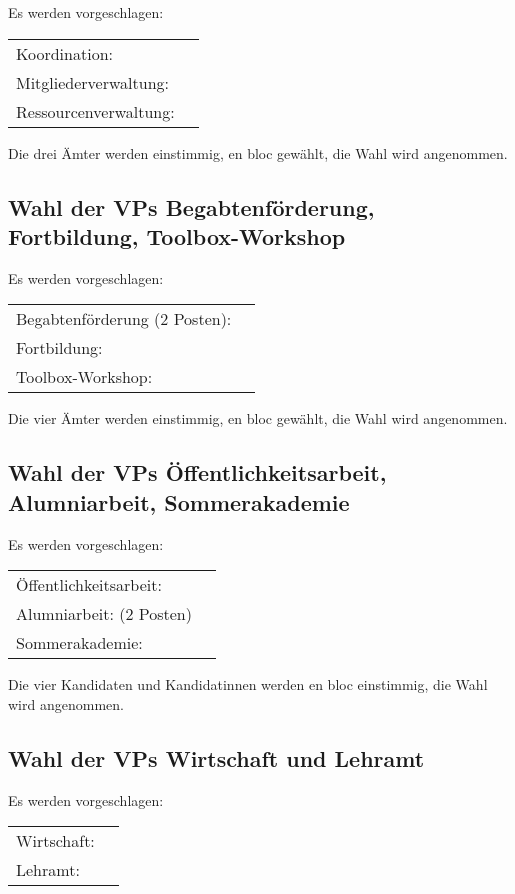 \documentclass[
  paper=a4,
  fontsize=12pt,
  parskip=half,
  headinclude=true,
]{scrartcl}
\begin{document}
Es werden vorgeschlagen:

\begin{tabular}{l l}
  Koordination: & \\
  Mitgliederverwaltung: & \\
  Ressourcenverwaltung: & \\
\end{tabular}

Die drei Ämter werden einstimmig, en bloc gewählt, die Wahl wird angenommen.


\subsection{Wahl der VPs Begabtenförderung, Fortbildung, Toolbox-Workshop}

Es werden vorgeschlagen:

\begin{tabular}{l l}
  Begabtenförderung (2 Posten): & \\
  Fortbildung: & \\
  Toolbox-Workshop: & \\
\end{tabular}

Die vier Ämter werden einstimmig, en bloc gewählt, die Wahl wird angenommen.


\subsection{Wahl der VPs Öffentlichkeitsarbeit, Alumniarbeit, Sommerakademie}

Es werden vorgeschlagen:

\begin{tabular}{l l}
  Öffentlichkeitsarbeit: & \\
  Alumniarbeit: (2 Posten) & \\
  Sommerakademie: & \\
\end{tabular}

Die vier Kandidaten und Kandidatinnen werden en bloc einstimmig, die Wahl wird angenommen.

\subsection{Wahl der VPs Wirtschaft und Lehramt}

Es werden vorgeschlagen:

\begin{tabular}{l l}
  Wirtschaft: & \\
  Lehramt:  & \\
\end{tabular}
\end{document}
